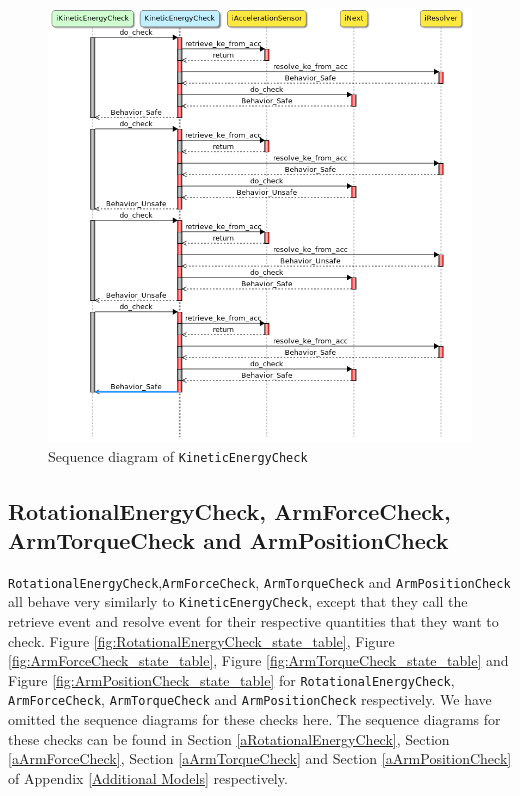 \documentclass[12pt]{scrreprt}
\begin{document}
\begin{appendices}
\begin{figure}[H]
    \centering
    \includegraphics[width=\textwidth]{Figures/results/modelling_figures/KineticEnergyCheck/KineticEnergyCheck_seq.png}
    \caption{Sequence diagram of \texttt{KineticEnergyCheck}}
    \label{fig:kineticenergycheck_seq}
\end{figure}

\subsection{RotationalEnergyCheck, ArmForceCheck, ArmTorqueCheck and ArmPositionCheck}
\texttt{RotationalEnergyCheck},\texttt{ArmForceCheck}, \texttt{ArmTorqueCheck} and \texttt{ArmPositionCheck} all behave very similarly to \texttt{KineticEnergyCheck}, except that they call the retrieve event and resolve event for their respective quantities that they want to check. Figure \ref{fig:RotationalEnergyCheck_state_table}, Figure \ref{fig:ArmForceCheck_state_table}, Figure \ref{fig:ArmTorqueCheck_state_table} and Figure \ref{fig:ArmPositionCheck_state_table} for \texttt{RotationalEnergyCheck}, \\\texttt{ArmForceCheck}, \texttt{ArmTorqueCheck} and \texttt{ArmPositionCheck} respectively. We have omitted the sequence diagrams for these checks here. The sequence diagrams for these checks can be found in Section \ref{aRotationalEnergyCheck}, Section \ref{aArmForceCheck}, Section \ref{aArmTorqueCheck} and Section \ref{aArmPositionCheck} of Appendix \ref{Additional Models} respectively.



\end{appendices}
\end{document}
